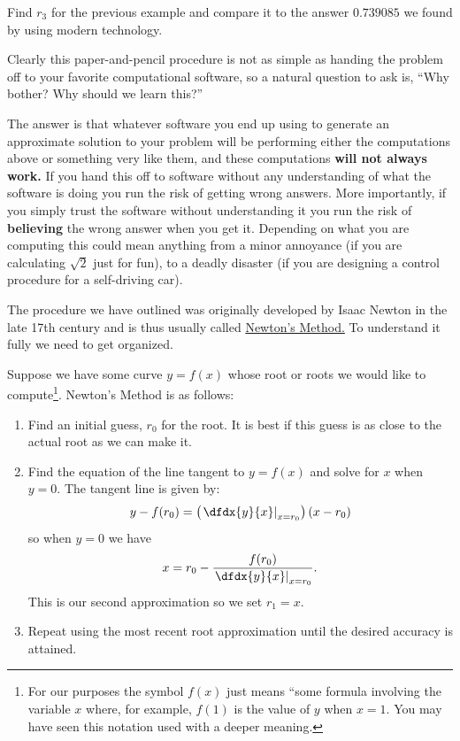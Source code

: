 \begin{embeddedproblem}{}
  Find $r_3$ for the previous example and compare it to the answer
  $0.739085$ we found by using modern technology.
\end{embeddedproblem}

Clearly this paper-and-pencil procedure is not as simple as handing
the problem off to your favorite computational software, so a natural
question to ask is, ``Why bother? Why should we learn this?''

The answer is that whatever software you end up using to generate an
approximate solution to your problem will be performing either the
computations above or something very like them, and these computations
{\bf will not always work.} If you hand this off to software without
any understanding of what the software is doing you run the risk of
getting wrong answers. More importantly, if you simply trust the
software without understanding it you run the risk of {\bf believing }
the wrong answer when you get it. Depending on what you are computing
this could mean anything from a minor annoyance (if you are
calculating $\sqrt{2}$ just for fun), to a deadly disaster (if you are
designing a control procedure for a self-driving car).

The procedure we have outlined was originally developed by Isaac
Newton in the late 17th century and is thus usually called
\underline{Newton's Method.} To understand it fully we need to get
organized.

Suppose we have some curve $y=f(x)$ whose root or roots we would like
to compute\footnote{For our purposes the symbol $f(x)$ just means
  ``some formula involving the variable $x$ where, for example, $f(1)$
  is the value of $y$ when $x=1.$ You may have seen this notation used
  with a deeper meaning.}. Newton's Method is as follows:
\begin{enumerate}
\item Find an initial guess, $r_0$ for the root. It is best if this
  guess is as close to the actual root as we can make it.
\item Find the equation of the line tangent to $y=f(x)$ and solve for
  $x$ when $y=0.$ The tangent line is given by:
$$
y-f(r_0) = \left(\left.\dfdx{y}{x}\right|_{x=r_0}\right)(x-r_0)
$$
so when $y=0$ we have
$$
x=r_0-\frac{f(r_0)}{\left.\dfdx{y}{x}\right|_{x=r_0}}.
$$
This is our second approximation so we set $r_1=x.$
\item Repeat using the most recent root approximation until the
  desired accuracy is attained. 
\end{enumerate}

